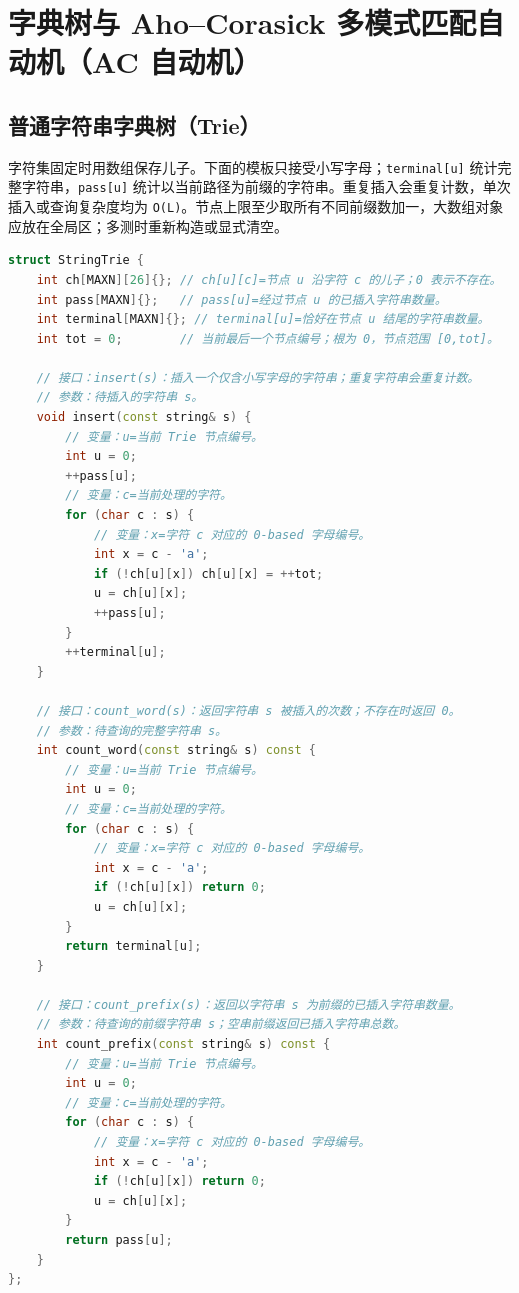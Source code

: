 \section{字典树与 Aho--Corasick 多模式匹配自动机（AC 自动机）}\label{ux5b57ux5178ux6811ux4e0e-ahocorasick-ux591aux6a21ux5f0fux5339ux914dux81eaux52a8ux673aac-ux81eaux52a8ux673a}

\subsection{普通字符串字典树（Trie）}\label{ux666eux901aux5b57ux7b26ux4e32ux5b57ux5178ux6811trie}

字符集固定时用数组保存儿子。下面的模板只接受小写字母；\passthrough{\lstinline!terminal[u]!} 统计完整字符串，\passthrough{\lstinline!pass[u]!} 统计以当前路径为前缀的字符串。重复插入会重复计数，单次插入或查询复杂度均为 \passthrough{\lstinline!O(L)!}。节点上限至少取所有不同前缀数加一，大数组对象应放在全局区；多测时重新构造或显式清空。

\begin{lstlisting}[language={C++}]
struct StringTrie {
    int ch[MAXN][26]{}; // ch[u][c]=节点 u 沿字符 c 的儿子；0 表示不存在。
    int pass[MAXN]{};   // pass[u]=经过节点 u 的已插入字符串数量。
    int terminal[MAXN]{}; // terminal[u]=恰好在节点 u 结尾的字符串数量。
    int tot = 0;        // 当前最后一个节点编号；根为 0，节点范围 [0,tot]。

    // 接口：insert(s)：插入一个仅含小写字母的字符串；重复字符串会重复计数。
    // 参数：待插入的字符串 s。
    void insert(const string& s) {
        // 变量：u=当前 Trie 节点编号。
        int u = 0;
        ++pass[u];
        // 变量：c=当前处理的字符。
        for (char c : s) {
            // 变量：x=字符 c 对应的 0-based 字母编号。
            int x = c - 'a';
            if (!ch[u][x]) ch[u][x] = ++tot;
            u = ch[u][x];
            ++pass[u];
        }
        ++terminal[u];
    }

    // 接口：count_word(s)：返回字符串 s 被插入的次数；不存在时返回 0。
    // 参数：待查询的完整字符串 s。
    int count_word(const string& s) const {
        // 变量：u=当前 Trie 节点编号。
        int u = 0;
        // 变量：c=当前处理的字符。
        for (char c : s) {
            // 变量：x=字符 c 对应的 0-based 字母编号。
            int x = c - 'a';
            if (!ch[u][x]) return 0;
            u = ch[u][x];
        }
        return terminal[u];
    }

    // 接口：count_prefix(s)：返回以字符串 s 为前缀的已插入字符串数量。
    // 参数：待查询的前缀字符串 s；空串前缀返回已插入字符串总数。
    int count_prefix(const string& s) const {
        // 变量：u=当前 Trie 节点编号。
        int u = 0;
        // 变量：c=当前处理的字符。
        for (char c : s) {
            // 变量：x=字符 c 对应的 0-based 字母编号。
            int x = c - 'a';
            if (!ch[u][x]) return 0;
            u = ch[u][x];
        }
        return pass[u];
    }
};
\end{lstlisting}

